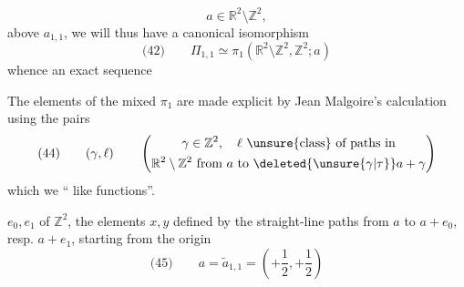 
\[
a\in\mathbb R^2\setminus\mathbb Z^2,
\]
 above $a_{1,1}$, we will thus have a canonical isomorphism
\[
\text{(42)}\qquad
\Pi_{1,1}\simeq\pi_1(\mathbb R^2\setminus\mathbb Z^2,\mathbb Z^2;a)
\]
whence an exact sequence

The elements of the mixed $\pi_1$ are made explicit by Jean Malgoire's calculation using the pairs
\[
\text{(44)}\qquad
(\gamma,\ell)\qquad
\left(\begin{gathered}
\gamma\in\mathbb Z^2,\quad \ell\ \text{\unsure{class} of paths in}\\
\mathbb R^2\setminus\mathbb Z^2\ \text{from }a\text{ to }\deleted{\unsure{\gamma|\tau}}a+\gamma
\end{gathered}\right)
\]
which we `` like functions''.

$e_0,e_1$ of $\mathbb Z^2$, the elements $x,y$ defined by the straight-line paths from $a$ to $a+e_0$, resp. $a+e_1$, starting from the origin
\[
\text{(45)}\qquad
 a=\widetilde a_{1,1}=\left(+\frac12,+\frac12\right)
\]

